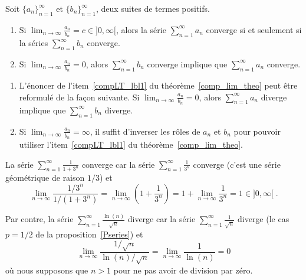 {\begin{theorem}
Soit $\displaystyle \{a_n\}_{n=1}^\infty$ et
$\displaystyle \{b_n\}_{n=1}^\infty$, deux suites de termes positifs.
\begin{enumerate}
\item Si $\displaystyle \lim_{n\rightarrow \infty} \frac{a_n}{b_n} = c
\in ]0,\infty[$, alors la série $\displaystyle \sum_{n=1}^\infty a_n$
converge si et seulement si la séries 
$\displaystyle \sum_{n=1}^\infty b_n$ converge.
\item \label{compLT_lbl1}
Si $\displaystyle \lim_{n\rightarrow \infty} \frac{a_n}{b_n} = 0$, alors
$\displaystyle \sum_{n=1}^\infty b_n$ converge implique que
$\displaystyle \sum_{n=1}^\infty a_n$ converge.
\end{enumerate}
\label{comp_lim_theo}
\end{theorem}

\begin{rmkList}
\begin{enumerate}
\item L'énoncer de l'item~\ref{compLT_lbl1} du
théorème~\ref{comp_lim_theo} peut être reformulé de la façon
suivante.  Si
$\displaystyle \lim_{n\rightarrow \infty} \frac{a_n}{b_n} = 0$, alors 
$\displaystyle \sum_{n=1}^\infty a_n$ diverge implique que
$\displaystyle \sum_{n=1}^\infty b_n$ diverge.
\item Si $\displaystyle \lim_{n\rightarrow \infty} \frac{a_n}{b_n} = \infty$,
il suffit d'inverser les rôles de $a_n$ et $b_n$ pour pouvoir utiliser
l'item~\ref{compLT_lbl1} du théorème~\ref{comp_lim_theo}.
\end{enumerate}
\end{rmkList}

\begin{egg}
La série $\displaystyle \sum_{n=1}^\infty \frac{1}{1+3^n}$ converge
car la série $\displaystyle \sum_{n=1}^\infty \frac{1}{3^n}$ converge
(c'est une série géométrique de raison $1/3$) et
\[
\lim_{n\rightarrow \infty} \frac{1/3^n}{1/(1+3^n)} 
= \lim_{n\rightarrow \infty} \left( 1 + \frac{1}{3^n}\right) 
= 1 + \lim_{n\rightarrow \infty}\frac{1}{3^n} = 1 \in ]0,\infty[ \; .
\]

Par contre, la série $\displaystyle \sum_{n=1}^\infty \frac{\ln(n)}{\sqrt{n}}$
diverge car la série $\displaystyle \sum_{n=1}^\infty \frac{1}{\sqrt{n}}$
diverge (le cas $p=1/2$ de la proposition~\ref{Pseries}) et
\[
\lim_{n\rightarrow \infty} \frac{1/\sqrt{n}}{\ln(n)/\sqrt{n}} 
= \lim_{n\rightarrow \infty} \frac{1}{\ln(n)} = 0
\]
où nous supposons que $n>1$ pour ne pas avoir de division par zéro.
\end{egg}

}
